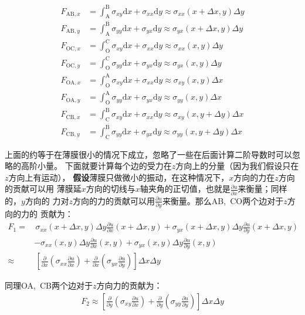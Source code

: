 \documentclass[a4paper]{ctexart}
\def\d{\mathrm{d}}
\newcommand{\mr}[1]{\mathrm{#1}}
\newcommand{\pdv}[2]{\frac{\partial{#1}}{\partial{#2}}}
\begin{document}
	\begin{align}
		F_{\mr{AB}, x} &= \int_{\mr{A}}^{\mr{B}} \sigma_{xy}\d x + \sigma_{xx}\d y \approx \sigma_{xx}(x+\Delta x, y)\Delta y\\
		F_{\mr{AB}, y} &= \int_{\mr{A}}^{\mr{B}} \sigma_{yy}\d x + \sigma_{yx}\d y \approx \sigma_{yx}(x+\Delta x, y)\Delta y\\
		F_{\mr{OC}, x} &= \int_{\mr{O}}^{\mr{C}} \sigma_{xy}\d x + \sigma_{xx}\d y \approx \sigma_{xx}(x, y)\Delta y\\
		F_{\mr{OC}, y} &= \int_{\mr{O}}^{\mr{C}} \sigma_{yy}\d x + \sigma_{yx}\d y \approx \sigma_{yx}(x, y)\Delta y\\
		F_{\mr{OA}, x} &= \int_{\mr{O}}^{\mr{A}} \sigma_{xy}\d x + \sigma_{xx}\d y \approx \sigma_{xy}(x, y)\Delta x\\
		F_{\mr{OA}, y} &= \int_{\mr{O}}^{\mr{A}} \sigma_{yy}\d x + \sigma_{yx}\d y \approx \sigma_{yy}(x, y)\Delta x\\
		F_{\mr{CB}, x} &= \int_{\mr{C}}^{\mr{B}} \sigma_{xy}\d x + \sigma_{xx}\d y \approx \sigma_{xy}(x, y + \Delta y)\Delta x\\
		F_{\mr{CB}, y} &= \int_{\mr{C}}^{\mr{B}} \sigma_{yy}\d x + \sigma_{yx}\d y \approx \sigma_{yy}(x, y + \Delta y)\Delta x
	\end{align}
	\par 上面的约等于在薄膜很小的情况下成立，忽略了一些在后面计算二阶导数时可以忽略的高阶小量。
	下面就要计算每个边的受力在$z$方向上的分量（因为我们假设只在$z$方向上有运动），
	\textbf{假设}薄膜只做微小的振动，在这种情况下，$x$方向的力在$z$方向的贡献可以用
	薄膜延$x$方向的切线与$x$轴夹角的正切值，也就是$\pdv{u}{x}$来衡量；同样的，$y$方向的
	力对$z$方向的力的贡献可以用$\pdv{u}{y}$来衡量。那么AB,\, CO两个边对于$z$方向的力的
	贡献为：
	\begin{align}
		F_{1} =& \,\sigma_{xx}(x+\Delta x, y)\Delta y\pdv{u}{x}(x+\Delta x, y) + \sigma_{yx}(x+\Delta x, y)\Delta y\pdv{u}{y}(x+\Delta x, y)\\
		&- \sigma_{xx}(x, y)\Delta y\pdv{u}{x}(x, y) + \sigma_{yx}(x, y)\Delta y\pdv{u}{y}(x, y)\\
		\approx& \, \left[\pdv{}{x}\left(\sigma_{xx}\pdv{u}{x}\right) + \pdv{}{x}\left(\sigma_{yx}\pdv{u}{y}\right)\right]\Delta x\Delta y
	\end{align}
	\par 同理OA,\, CB两个边对于$z$方向力的贡献为：
	\begin{align}
		F_{2} \approx  \left[\pdv{}{y}\left(\sigma_{xy}\pdv{u}{x}\right) + \pdv{}{y}\left(\sigma_{yy}\pdv{u}{y}\right)\right]\Delta x\Delta y
	\end{align}
\end{document}
